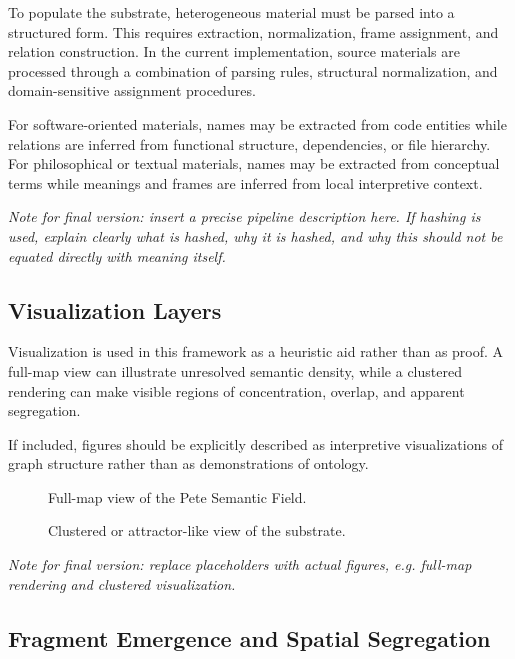 \documentclass[11pt,a4paper]{article}
\begin{document}
To populate the substrate, heterogeneous material must be parsed into a structured form. This requires extraction, normalization, frame assignment, and relation construction. In the current implementation, source materials are processed through a combination of parsing rules, structural normalization, and domain-sensitive assignment procedures.

For software-oriented materials, names may be extracted from code entities while relations are inferred from functional structure, dependencies, or file hierarchy. For philosophical or textual materials, names may be extracted from conceptual terms while meanings and frames are inferred from local interpretive context.

\textit{Note for final version: insert a precise pipeline description here. If hashing is used, explain clearly what is hashed, why it is hashed, and why this should not be equated directly with meaning itself.}

\subsection{Visualization Layers}

Visualization is used in this framework as a heuristic aid rather than as proof. A full-map view can illustrate unresolved semantic density, while a clustered rendering can make visible regions of concentration, overlap, and apparent segregation.

If included, figures should be explicitly described as interpretive visualizations of graph structure rather than as demonstrations of ontology.

\begin{figure}[H]
    \centering
    \caption{Full-map view of the Pete Semantic Field.}
    \label{fig:fullmap}
\end{figure}

\begin{figure}[H]
    \centering
    \caption{Clustered or attractor-like view of the substrate.}
    \label{fig:organism}
\end{figure}

\textit{Note for final version: replace placeholders with actual figures, e.g. full-map rendering and clustered visualization.}

\subsection{Fragment Emergence and Spatial Segregation}
\end{document}
